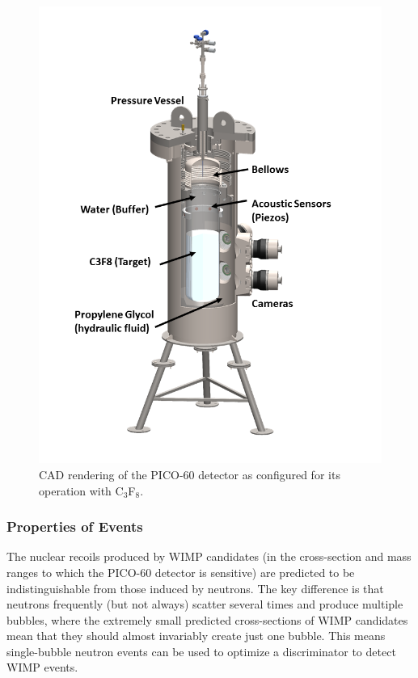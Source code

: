 \documentclass[10pt]{article}
\begin{document}
\begin{figure}[H]
    \centering
    \includegraphics[width=\textwidth]{pico_cad}
    \caption{\label{pico_cad} CAD rendering of the PICO-60 detector as configured for its operation with C$_3$F$_8$.}
\end{figure}

\subsubsection{Properties of Events}

The nuclear recoils produced by WIMP candidates (in the cross-section and mass ranges to which the PICO-60 detector is sensitive) are predicted to be indistinguishable from those induced by neutrons. The key difference is that neutrons frequently (but not always) scatter several times and produce multiple bubbles, where the extremely small predicted cross-sections of WIMP candidates mean that they should almost invariably create just one bubble. This means single-bubble neutron events can be used to optimize a discriminator to detect WIMP events.
\end{document}
